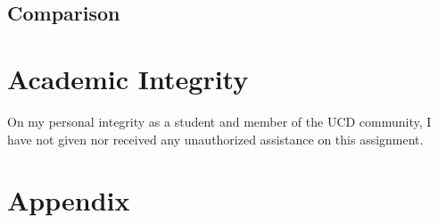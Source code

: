 \documentclass[a4paper,12pt]{article}
\begin{document}
\subsection{Comparison}


\section{Academic Integrity}
On my personal integrity as a student and member of the UCD community, I have not given nor received any unauthorized assistance on this assignment.


\section{Appendix}



\end{document}
